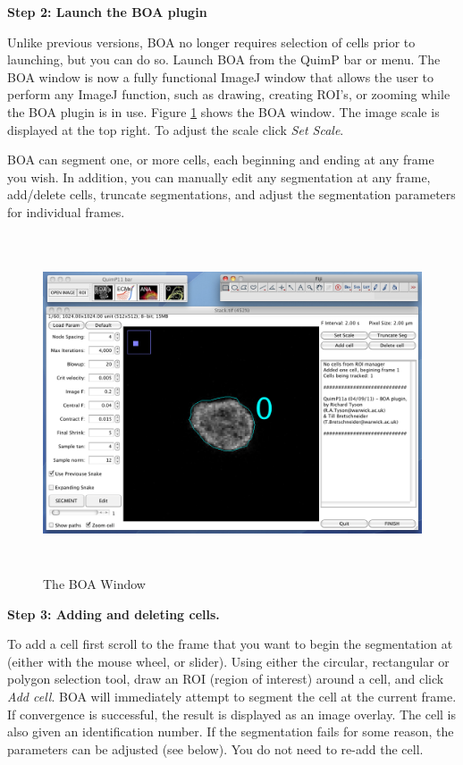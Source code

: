 \documentclass[a4paper,12pt]{article}
\begin{document}
\textbf{Step 2: Launch the BOA plugin} 

Unlike previous versions, BOA no longer requires selection of cells prior to launching, but you can do so.  Launch BOA from the QuimP bar or menu.
The BOA window is now a fully functional ImageJ window that allows the user to perform any ImageJ function, such as drawing,
creating ROI's, or zooming while the BOA plugin is in use.  Figure \ref{boaWindow} shows the BOA window.
The image scale is displayed at the top right.  To adjust the scale click \textit{Set Scale}.      

BOA can segment one, or more cells, each beginning and ending at any frame you wish.  In addition, you can manually 
edit any segmentation at any frame, add/delete cells, truncate segmentations, and adjust the segmentation
parameters for individual frames.

\begin{figure}[ht]
   \centering
   \includegraphics[height=10cm]{boaWindow.png}
   \caption{The BOA Window}
   \label{boaWindow}
\end{figure}

\textbf{Step 3: Adding and deleting cells.} 

To add a cell first scroll to the frame that you want to begin the segmentation at (either with the mouse wheel, or slider).  Using either the
circular, rectangular or polygon selection tool, draw an ROI (region of interest) around a cell, and click \textit{Add cell}.
BOA will immediately attempt to segment 
the cell at the current frame.  If convergence is successful, the result is displayed as an image overlay. The cell is also given an
identification number.
If the segmentation fails for some reason, the parameters can be adjusted (see below). You do not need to re-add the cell.
\end{document}
